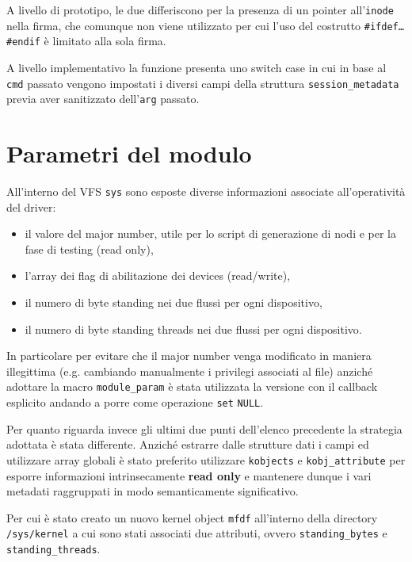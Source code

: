 \documentclass{article}
\begin{document}
A livello di prototipo, le due differiscono per la presenza di un pointer all'\texttt{inode} nella firma, che comunque non viene utilizzato per cui l'uso del costrutto \texttt{\#ifdef\dots\#endif} è limitato alla sola firma.

A livello implementativo la funzione presenta uno switch case in cui in base al \texttt{cmd} passato vengono impostati i diversi campi della struttura \texttt{session\_metadata} previa aver sanitizzato dell'\texttt{arg} passato.

\section*{Parametri del modulo}
All'interno del VFS \texttt{sys} sono esposte diverse informazioni associate all'operatività del driver:
\begin{itemize}
        \item il valore del major number, utile per lo script di generazione di nodi e per la fase di testing (read only),
        \item l'array dei flag di abilitazione dei devices (read/write),
        \item il numero di byte standing nei due flussi per ogni dispositivo,
        \item il numero di byte standing threads nei due flussi per ogni dispositivo.
\end{itemize}

In particolare per evitare che il major number venga modificato in maniera illegittima (e.g. cambiando manualmente i privilegi associati al file) anziché adottare la macro \texttt{module\_param} è stata utilizzata la versione con il callback esplicito andando a porre come operazione \texttt{set} \texttt{NULL}.

Per quanto riguarda invece gli ultimi due punti dell'elenco precedente la strategia adottata è stata differente. Anziché estrarre dalle strutture dati i campi ed utilizzare array globali è stato preferito utilizzare \texttt{kobjects} e \texttt{kobj\_attribute} per esporre informazioni intrinsecamente \textbf{read only} e mantenere dunque i vari metadati raggruppati in modo semanticamente significativo.

Per cui è stato creato un nuovo kernel object \texttt{mfdf} all'interno della directory \texttt{/sys/kernel} a cui sono stati associati due attributi, ovvero \texttt{standing\_bytes} e \texttt{standing\_threads}.
\end{document}
